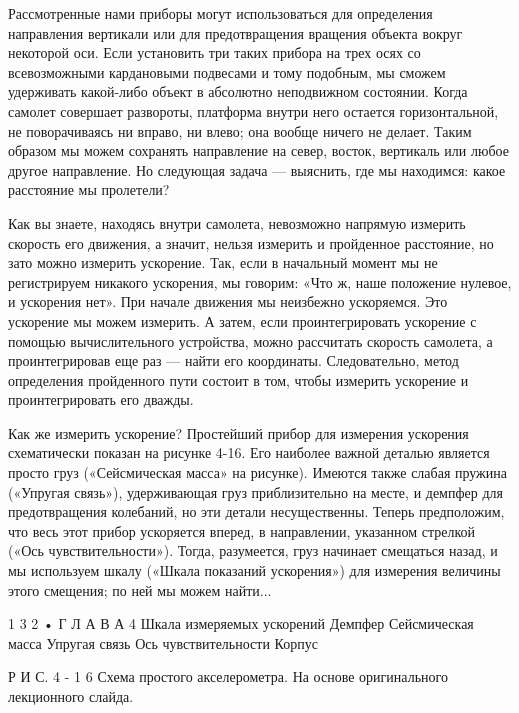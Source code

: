 \documentclass[10pt,oneside]{article}
\newcommand{\TipsSubsection}[1]{\par\vspace{6bp}{\normalsize\bfseries #1\par}\vspace{2bp}}
\begin{document}
\TipsSubsection{4-7 Акселерометры}

Рассмотренные нами приборы могут использоваться для определения направления вертикали или для предотвращения вращения объекта вокруг некоторой оси. Если установить три таких прибора на трех осях со всевозможными кардановыми подвесами и тому подобным, мы сможем удерживать какой-либо объект в абсолютно неподвижном состоянии. Когда самолет совершает развороты, платформа внутри него остается горизонтальной, не поворачиваясь ни вправо, ни влево; она вообще ничего не делает. Таким образом мы можем сохранять направление на север, восток, вертикаль или любое другое направление. Но следующая задача --- выяснить, где мы находимся: какое расстояние мы пролетели?\par

Как вы знаете, находясь внутри самолета, невозможно напрямую измерить скорость его движения, а значит, нельзя измерить и пройденное расстояние, но зато можно измерить ускорение. Так, если в начальный момент мы не регистрируем никакого ускорения, мы говорим: «Что ж, наше положение нулевое, и ускорения нет». При начале движения мы неизбежно ускоряемся. Это ускорение мы можем измерить. А затем, если проинтегрировать ускорение с помощью вычислительного устройства, можно рассчитать скорость самолета, а проинтегрировав еще раз --- найти его координаты. Следовательно, метод определения пройденного пути состоит в том, чтобы измерить ускорение и проинтегрировать его дважды.\par

Как же измерить ускорение? Простейший прибор для измерения ускорения схематически показан на рисунке 4-16. Его наиболее важной деталью является просто груз («Сейсмическая масса» на рисунке). Имеются также слабая пружина («Упругая связь»), удерживающая груз приблизительно на месте, и демпфер для предотвращения колебаний, но эти детали несущественны. Теперь предположим, что весь этот прибор ускоряется вперед, в направлении, указанном стрелкой («Ось чувствительности»). Тогда, разумеется, груз начинает смещаться назад, и мы используем шкалу («Шкала показаний ускорения») для измерения величины этого смещения; по ней мы можем найти...\par

1 3 2 • Г Л А В А  4 Шкала измеряемых ускорений Демпфер Сейсмическая масса Упругая связь Ось чувствительности Корпус\par

Р И С.  4 - 1 6 Схема простого акселерометра. На основе оригинального лекционного слайда.\par
\end{document}
